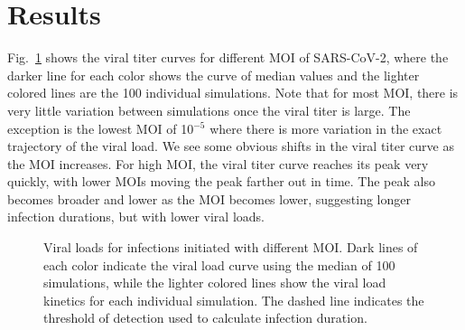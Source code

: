 \section{Results}

Fig.\ \ref{curves} shows the viral titer curves for different MOI of SARS-CoV-2, where the darker line for each color shows the curve of median values and the lighter colored lines are the 100 individual simulations. Note that for most MOI, there is very little variation between simulations once the viral titer is large. The exception is the lowest MOI of 10$^{-5}$ where there is more variation in the exact trajectory of the viral load. We see some obvious shifts in the viral titer curve as the MOI increases. For high MOI, the viral titer curve reaches its peak very quickly, with lower MOIs moving the peak farther out in time. The peak also becomes broader and lower as the MOI becomes lower, suggesting longer infection durations, but with lower viral loads.
\begin{figure}[!h]
\begin{center}
\caption{Viral loads for infections initiated with different MOI. Dark lines of each color indicate the viral load curve using the median of 100 simulations, while the lighter colored lines show the viral load kinetics for each individual simulation. The dashed line indicates the threshold of detection used to calculate infection duration. \label{curves}}
\end{center}
\end{figure}

